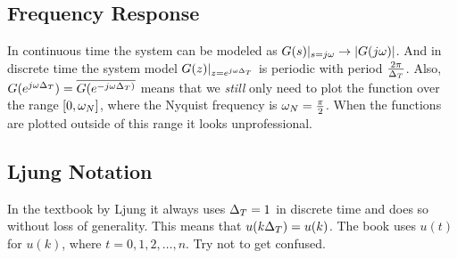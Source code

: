 \subsection{Frequency Response}
In continuous time the system can be modeled as $G(s)|_{s=j\omega}\to|G(j\omega)|$. And in discrete time the system model $G(z)|_{z=e^{j\omega\Delta_T}}$ is periodic with period $\frac{2\pi}{\Delta_T}$. Also, $G(e^{j\omega\Delta_T}) = \overline{G(e^{-j\omega\Delta_T)}}$ means that we  \textit{still} only need to plot the function over the range $[0, \omega_N]$, where the Nyquist frequency is $\omega_N=\frac{\pi}{2}$. When the functions are plotted outside of this range it looks unprofessional.

\subsection{Ljung Notation}
In the textbook by Ljung it always uses $\Delta_T=1$ in discrete time and does so without loss of generality. This means that $u(k\Delta_T) = u(k)$. The book uses $u(t)$ for $u(k)$, where $t=0,1,2,\ldots,n$. Try not to get confused.

